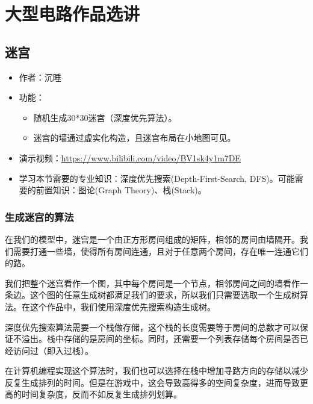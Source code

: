 \chapter{大型电路作品选讲}

\section{迷宫}

\begin{itemize}
	\item 作者：沉睡
	\item 功能：
	\begin{itemize}
		\item 随机生成30*30迷宫（深度优先算法）。
		\item 迷宫的墙通过虚实化构造，且迷宫布局在小地图可见。
	\end{itemize}
	\item 演示视频：\url{https://www.bilibili.com/video/BV1sk4y1m7DE}
	\item 学习本节需要的专业知识：深度优先搜索(Depth-First-Search, DFS)。可能需要的前置知识：图论(Graph Theory)、栈(Stack)。
\end{itemize}

\subsection{生成迷宫的算法}
在我们的模型中，迷宫是一个由正方形房间组成的矩阵，相邻的房间由墙隔开。我们需要打通一些墙，使得所有房间连通，且对于任意两个房间，存在唯一连通它们的路。

我们把整个迷宫看作一个图，其中每个房间是一个节点，相邻房间之间的墙看作一条边。这个图的任意生成树都满足我们的要求，所以我们只需要选取一个生成树算法。在这个作品中，我们使用深度优先搜索构造生成树。

深度优先搜索算法需要一个栈做存储，这个栈的长度需要等于房间的总数才可以保证不溢出。栈中存储的是房间的坐标。同时，还需要一个列表存储每个房间是否已经访问过（即入过栈）。

\begin{remark}
在计算机编程实现这个算法时，我们也可以选择在栈中增加寻路方向的存储以减少反复生成排列的时间。但是在游戏中，这会导致高得多的空间复杂度，进而导致更高的时间复杂度，反而不如反复生成排列划算。
\end{remark}

